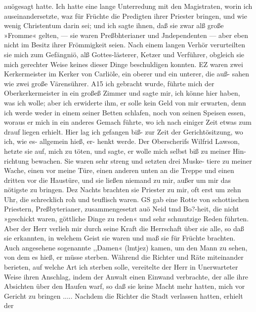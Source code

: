auögesagt hatte. Ich hatte eine lange Unterredung mit den
Magistraten, worin ich auseinandersetzte, waz für Früchte die
Predigten ihrer Priester bringen, und wie wenig Christentum darin
sei; und ich sagte ihnen, daß sie zwar alß große »Fromme«
gelten, — sie waren Preßbhterianer und Jndependenten — aber
eben nicht im Besitz ihrer Frömmigkeit seien. Nach einem langen
Verhör verurteilten sie mich zum Gefängniö, alß Gottes-lästerer,
Ketzer und Verführer, obgleich sie mich gerechter Weise keines
dieser Dinge beschuldigen konnten. EZ waren zwei Kerkermeister
im Kerker von Carliöle, ein oberer und ein unterer, die auß-
sahen wie zwei große Värensührer. A15 ich gebracht wurde,
führte mich der Oberkerkermeister in ein großeß Zimmer und sagte
mir, ich könne hier haben, was ich wolle; aber ich erwiderte
ihm, er solle kein Geld von mir erwarten, denn ich werde weder
in einem seiner Betten schlafen, noch von seinen Speisen essen,
woraus er mich in ein anderes Gemach führte, wo ich nach einiger
Zeit etwas zum drauf liegen erhielt. Hier lag ich gefangen biß-
zur Zeit der Gerichtösitzung, wo ich, wie es- allgemein hieß, er-
henkt werde. Der Oberscherifs Wilfrid Lawson, hetzte sie auf,
mich zu töten, und sagte, er wolle mich selbst biß zu meiner Hin-
richtung bewachen. Sie waren sehr streng und setzten drei Muske-
tiere zu meiner Wache, einen vor meine Türe, einen anderen
unten an die Treppe und einen dritten vor die Haustüre, und
sie ließen niemand zu mir, außer um mir das nötigste zu bringen.
Dez Nachts brachten sie Priester zu mir, oft erst um zehn Uhr,
die schrecklich roh und teuflisch waren. GS gab eine Rotte von
schottischen Priestern, Preßbyterianer, zusammengesetzt auö Neid
tmd Bo?-heit, die nicht »geschickt waren, göttliche Dinge zu reden«
und sehr schmutzige Reden führten. Aber der Herr verlieh mir
durch seine Kraft die Herrschaft über sie alle, so daß sie erkannten,
in welchem Geist sie waren und maß sie für Früchte brachten.
Auch angesehene sogenannte ,,Damen« (lmtjez) kamen, um den
Mann zu sehen, von dem es hieß, er müsse sterben. Während
die Richter und Räte miteinander berieten, auf welche Art ich
sterben solle, vereitelte der Herr in Unerwarteter Weise ihren
Anschlag, indem der Anwalt einen Einwand verbrachte, der
alle ihre Absichten über den Haufen warf, so daß sie keine
Macht mehr hatten, mich vor Gericht zu bringen .....
Nachdem die Richter die Stadt verlassen hatten, erhielt der


